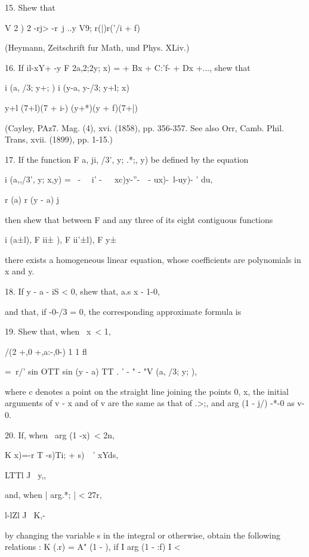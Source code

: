 
15. Shew that

V 2 ) 2 -rj> -r\ j ..y V9; r(|)r('/i + f)

(Heymann, Zeitschrift fur Math, und Phys. XLiv.)

16. If il-xY+ -y F 2a,2;2y; x) = + Bx + C:'f- + Dx +..., shew that

i (a, /3; y+; ) i (y-a, y-/3; y+l; x)

y+l (7+l)(7 + i-) (y+*)(y + f)(7+|)

(Cayley, PAz7. Mag. (4), xvi. (1858), pp. 356-357. See also Orr, Camb.
Phil. Trans, xvii. (1899), pp. 1-15.)

17. If the function F a, ji, /3', y; .*;, y) be defined by the
equation

i (a,,/3', y; x,y) = \ - \ \ i' -\ \ ~xc)y-''-\ \ - ux)-\ l-uy)- '
du,

r (a) r (y - a) j

then shew that between F and any three of its eight contiguous
functions

i (a±l), F ii± ), F ii'±l), F y±\ \

there exists a homogeneous linear equation, whose coefficients are
polynomials in x and y.


%
%

18. If y - a - iS < 0, shew that, a.s x - 1-0,

and that, if -0-/3 = 0, the corresponding approximate formula is


19. Shew that, when \ x\ < 1,

/(2 +,0 +,a:-,0-) 1 1 fl

= \,r/' sin OTT sin (y - a) TT . ' - " - "V (a, /3; y; ),

where c denotes a point on the straight line joining the points 0, x,
the initial arguments of v - x and of v are the same as that of .>;,
and arg (1 - j/) -*-0 as v- 0.


20. If, when \ arg (1 -x)\ < 2n,

K x)=-r T -s)Ti; + s)\ \ ' xYds,

LTTl J \ y,,

and, when | arg.*; | < 27r,

l-lZl J \ K,-

by changing the variable s in the integral or otherwise, obtain the
following relations : K (.r) = A" (1 - ), if I arg (1 - :f) I <

